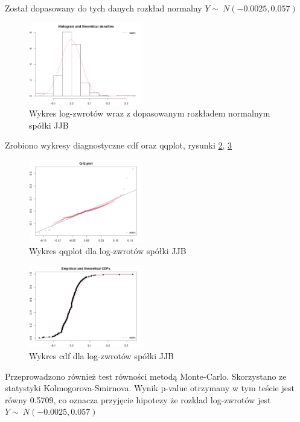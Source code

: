 \documentclass[a4paper,11pt]{article}
\begin{document}
Został dopasowany do tych danych rozkład normalny $Y \sim\ N(-0.0025,0.057 )$
\begin{figure}[!htb]
	\centering
	\includegraphics[width=5cm]{jjb_histwykres_log.png}
	\caption{Wykres log-zwrotów wraz z dopasowanym rozkładem normalnym spółki JJB}
         \label{fig:jjb_histwykres_log}
\end{figure}

\newpage
Zrobiono wykresy diagnostyczne cdf oraz qqplot, rysunki \ref{fig:jjb_qqplot_log}, \ref{fig:jjb_cdf_log}

\begin{figure}[!htb]
	\centering
	\includegraphics[width=5cm]{jjb_qqplot_log.png}
	\caption{Wykres qqplot dla log-zwrotów spółki JJB}
         \label{fig:jjb_qqplot_log}
\end{figure}

\begin{figure}[!htb]
	\centering
	\includegraphics[width=5cm]{jjb_cdf_log.png}
	\caption{Wykres cdf dla log-zwrotów spółki JJB}
         \label{fig:jjb_cdf_log}
\end{figure}

\newpage
Przeprowadzono również test równości metodą Monte-Carlo. Skorzystano ze statystyki Kolmogorova-Smirnova. Wynik p-value otrzymany w tym teście jest równy 0.5709, co oznacza przyjęcie hipotezy że rozklad log-zwrotów jest  $Y \sim\  N(-0.0025,0.057 )$
\end{document}
